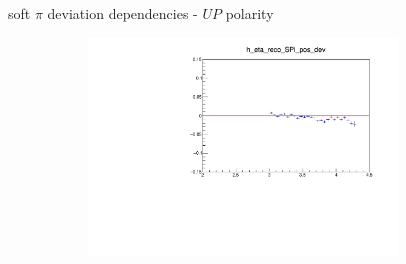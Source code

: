 \documentclass[11pt]{beamer}
\begin{document}
\begin{frame}{soft $\pi$ deviation dependencies - $UP$ polarity}
\begin{figure}
\begin{subfigure}{0.45\textwidth}
\end{subfigure}
\begin{subfigure}{0.45\textwidth}
\includegraphics[width=0.9\textwidth]{sec/up_pdf/deviation/h_eta_reco_SPi_pos_dev.pdf}
\end{subfigure}
\end{figure}
\end{frame}
\end{document}
